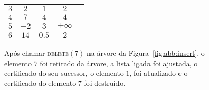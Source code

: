 \begin{figure}[htb]
\begin{tabular}{|c|c|c|c|c|}
        $3$ & $2$   & $1$   & $2$                         \\

        $4$ & $7$   & $4$   & $4$                         \\

        $5$ & $-2$  & $3$   & $+\infty$                   \\

        $6$ & $14$  & $0.5$ & $2$                         \\
        \hline
    \end{tabular}
    \caption[ABB após chamar \textsc{delete}]{Após chamar
        {\normalfont \textsc{delete}$(7)$} na árvore da Figura~\ref{fig:abb:insert}, o
    elemento $7$ foi retirado da árvore, a lista ligada foi
    ajustada, o certificado do seu sucessor, o elemento $1$, foi
    atualizado e o certificado do elemento $7$ foi destruído.}
    \label{fig:abb:delete}
\end{figure}